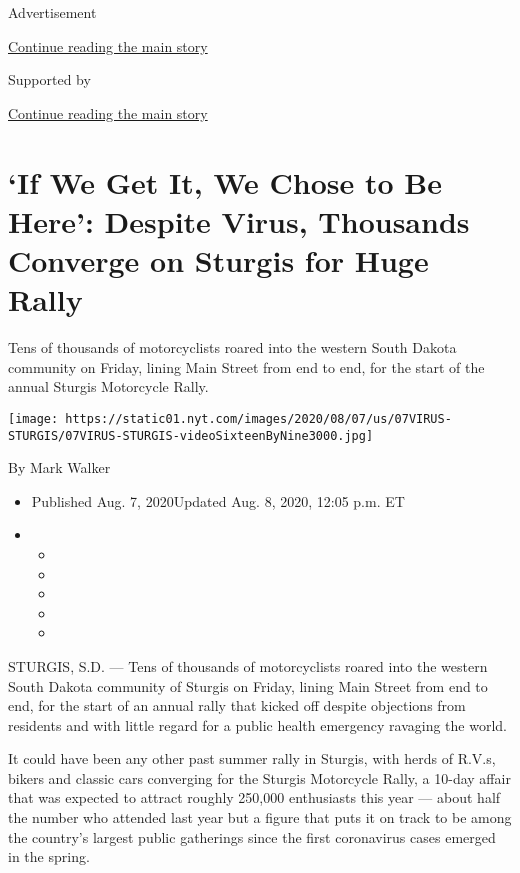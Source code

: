Advertisement

\protect\hyperlink{after-top}{Continue reading the main story}

Supported by

\protect\hyperlink{after-sponsor}{Continue reading the main story}

\hypertarget{if-we-get-it-we-chose-to-be-here-despite-virus-thousands-converge-on-sturgis-for-huge-rally}{%
\section{`If We Get It, We Chose to Be Here': Despite Virus, Thousands
Converge on Sturgis for Huge
Rally}\label{if-we-get-it-we-chose-to-be-here-despite-virus-thousands-converge-on-sturgis-for-huge-rally}}

Tens of thousands of motorcyclists roared into the western South Dakota
community on Friday, lining Main Street from end to end, for the start
of the annual Sturgis Motorcycle Rally.

\texttt{[image: https://static01.nyt.com/images/2020/08/07/us/07VIRUS-STURGIS/07VIRUS-STURGIS-videoSixteenByNine3000.jpg]}

By Mark Walker

\begin{itemize}
\item
  Published Aug. 7, 2020Updated Aug. 8, 2020, 12:05 p.m. ET
\item
  \begin{itemize}
  \item
  \item
  \item
  \item
  \item
  \end{itemize}
\end{itemize}

STURGIS, S.D. --- Tens of thousands of motorcyclists roared into the
western South Dakota community of Sturgis on Friday, lining Main Street
from end to end, for the start of an annual rally that kicked off
despite objections from residents and with little regard for a public
health emergency ravaging the world.

It could have been any other past summer rally in Sturgis, with herds of
R.V.s, bikers and classic cars converging for the Sturgis Motorcycle
Rally, a 10-day affair that was expected to attract roughly 250,000
enthusiasts this year --- about half the number who attended last year
but a figure that puts it on track to be among the country's largest
public gatherings since the first coronavirus cases emerged in the
spring.


